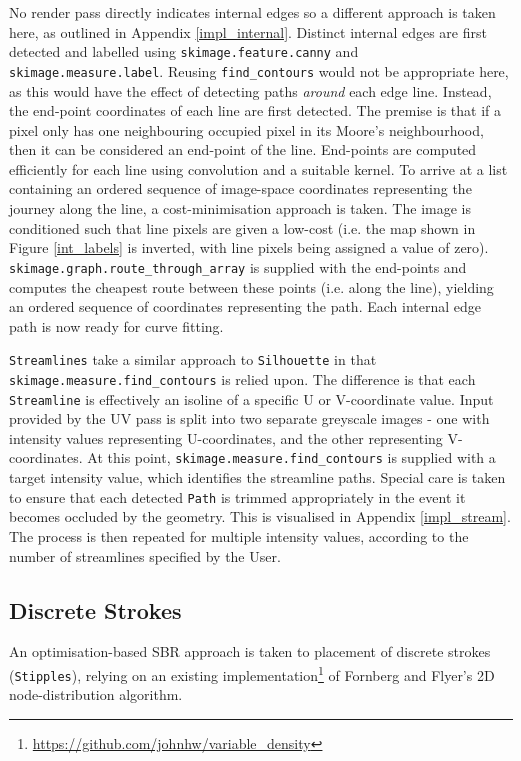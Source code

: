 {No render pass directly indicates internal edges so a different approach is taken here, as outlined in Appendix \ref{impl_internal}.
Distinct internal edges are first detected and labelled using \texttt{skimage.feature.canny} and \texttt{skimage.measure.label}. Reusing \texttt{find\_contours} would not be appropriate here, as this would have the effect of detecting paths \emph{around} each edge line.
Instead, the end-point coordinates of each line are first detected.
The premise is that if a pixel only has one neighbouring occupied pixel in its Moore's neighbourhood, then it can be considered an end-point of the line.
End-points are computed efficiently for each line using convolution and a suitable kernel.
To arrive at a list containing an ordered sequence of image-space coordinates representing the journey along the line, a cost-minimisation approach is taken.
The image is conditioned such that line pixels are given a low-cost (i.e. the map shown in Figure \ref{int_labels} is inverted, with line pixels being assigned a value of zero).
\texttt{skimage.graph.route\_through\_array} is supplied with the end-points and computes the cheapest route between these points (i.e. along the line), yielding an ordered sequence of coordinates representing the path.
Each internal edge path is now ready for curve fitting.

\texttt{Streamlines} take a similar approach to \texttt{Silhouette} in that \texttt{skimage.measure.find\_contours} is relied upon.
The difference is that each \texttt{Streamline} is effectively an isoline of a specific U or V-coordinate value.
Input provided by the UV pass is split into two separate greyscale images - one with intensity values representing U-coordinates, and the other representing V-coordinates.
At this point, \texttt{skimage.measure.find\_contours} is supplied with a target intensity value, which identifies the streamline paths.
Special care is taken to ensure that each detected \texttt{Path} is trimmed appropriately in the event it becomes occluded by the geometry.
This is visualised in Appendix \ref{impl_stream}.
The process is then repeated for multiple intensity values, according to the number of streamlines specified by the User.

\subsection{Discrete Strokes}

An optimisation-based SBR approach is taken to placement of discrete strokes (\texttt{Stipples}), relying on an existing implementation\footnote{\url{https://github.com/johnhw/variable_density}} of Fornberg and Flyer's \citep{fornberg2015} 2D node-distribution algorithm.

}
